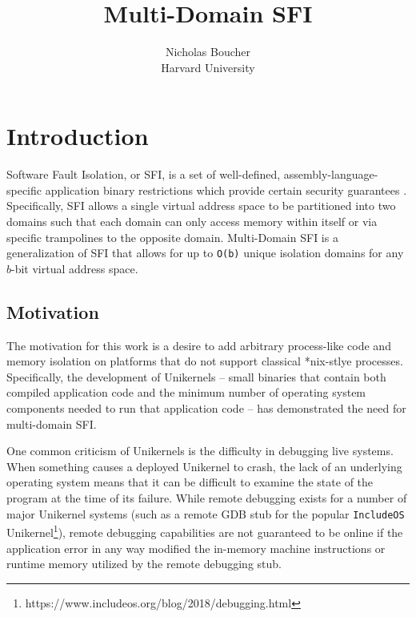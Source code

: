 \documentclass[12pt]{article}
\begin{document}
 
\title{Multi-Domain SFI}
\author{Nicholas Boucher \\ Harvard University}

\maketitle

\section{Introduction}

Software Fault Isolation, or SFI, is a set of well-defined, assembly-language-specific application binary restrictions which provide certain security guarantees \cite{wahbe_efficient_1993}. Specifically, SFI allows a single virtual address space to be partitioned into two domains such that each domain can only access memory within itself or via specific trampolines to the opposite domain. Multi-Domain SFI is a generalization of SFI that allows for up to \texttt{O(b)} unique isolation domains for any $b$-bit virtual address space.

\subsection{Motivation}

The motivation for this work is a desire to add arbitrary process-like code and memory isolation on platforms that do not support classical *nix-stlye processes. Specifically, the development of Unikernels -- small binaries that contain both compiled application code and the minimum number of operating system components needed to run that application code \cite{madhavapeddy_unikernels:_2013} -- has demonstrated the need for multi-domain SFI.

One common criticism of Unikernels is the difficulty in debugging live systems. When something causes a deployed Unikernel to crash, the lack of an underlying operating system means that it can be difficult to examine the state of the program at the time of its failure. While remote debugging exists for a number of major Unikernel systems (such as a remote GDB stub for the popular \texttt{IncludeOS} \cite{a._bratterud_includeos:_2015} Unikernel\footnote{https://www.includeos.org/blog/2018/debugging.html}), remote debugging capabilities are not guaranteed to be online if the application error in any way modified the in-memory machine instructions or runtime memory utilized by the remote debugging stub.
\end{document}
